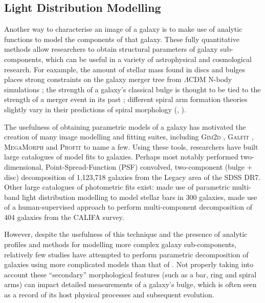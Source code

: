 \documentclass[../main.tex]{subfiles}
\begin{document}
\subsection{Light Distribution Modelling}

Another way to characterise an image of a galaxy is to make use of analytic functions to model the components of that galaxy. These fully quantitative methods allow researchers to obtain structural parameters of galaxy sub-components, which can be useful in a variety of astrophysical and cosmological research. For eaxample, the amount of stellar mass found in discs and bulges places strong constraints on the galaxy merger tree from $\Lambda\mathrm{CDM}$ N-body simulations \citep{Hopkins2010:1004.2708v3}; the strength of a galaxy's classical bulge is thought to be tied to the strength of a merger event in its past \citep{Kormendy2010:1009.3015v1}; different spiral arm formation theories slightly vary in their predictions of spiral morphology (\citealt{Dobbs2014:1407.5062v1}, \citealt{Pour-Imani2016:1608.00969v1} \citealt{Hart2017:1708.04628v1}).

The usefulness of obtaining parametric models of a galaxy has motivated the creation of many image modelling and fitting suites, including \textsc{Gim2d} \citep{gim2d-paper}, \textsc{Galfit} \citep{galfit-paper}, \textsc{MegaMorph} \citep{megamorph-paper} and \textsc{Profit} \citep{profit-paper} to name a few. Using these tools, researchers have built large catalogues of model fits to galaxies. Perhaps most notably \citet{Simard2002:astro-ph/0205025v2} performed two-dimensional, Point-Spread-Function (PSF) convolved, two-component (bulge + disc) decomposition of 1,123,718 galaxies from the Legacy area of the SDSS DR7. Other large catalogues of photometric fits exist: \cite{Gadotti2010:1003.1719v2} made use of parametric multi-band light distribution modelling to model stellar bars in 300 galaxies, \cite{Mendez-Abreu2016:1610.05324v1} made use of a human-supervised approach to perform multi-component decomposition of 404 galaxies from the CALIFA survey\citep{Sanchez2011:1111.0962v2}.

However, despite the usefulness of this technique and the presence of analytic profiles and methods for modelling more complex galaxy sub-components, relatively few studies have attempted to perform parametric decomposition of galaxies using more complicated models than that of \citet{Simard2002:astro-ph/0205025v2}. Not properly taking into account these ``secondary'' morphological features (such as a bar, ring and spiral arms) can impact detailed measurements of a galaxy's bulge, which is often seen as a record of its host physical processes and subsequent evolution. 
\end{document}
